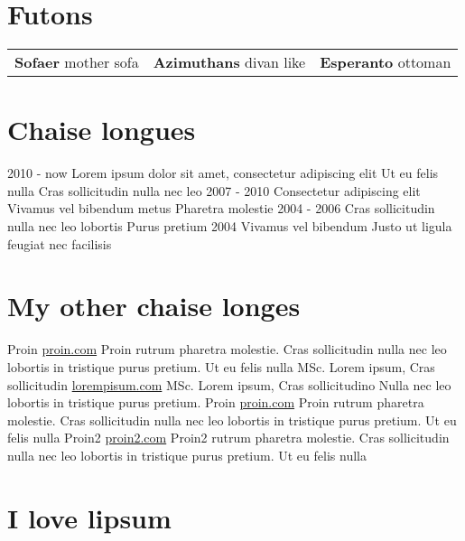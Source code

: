 \documentclass[]{viccuad-cv}
\begin{document}
\section{Futons}
    \begin{tabularx}{\linewidth}{XXr}
        \textbf{Sofaer} mother sofa & \textbf{Azimuthans} divan like & \textbf{Esperanto} ottoman \tabularnewline
    \end{tabularx}


\section{Chaise longues}
    \begin{entrylistdated}
      \entrydated
        {2010 - now}
        {Lorem ipsum dolor sit amet, consectetur adipiscing elit}
        {Ut eu felis nulla}
        {Cras sollicitudin nulla nec leo}
      \entrydated
        {2007 - 2010}
        {Consectetur adipiscing elit}
        {Vivamus vel bibendum metus}
        {Pharetra molestie}
      \entrydated
        {2004 - 2006}
        {Cras sollicitudin nulla nec leo lobortis}
        {}
        {Purus pretium}
      \entrydated
        {2004}
        {Vivamus vel bibendum}
        {Justo ut ligula feugiat nec facilisis}
        {}
    \end{entrylistdated}

\section{My other chaise longes}
    \begin{entrylist}
      \entry
        {Proin}
        {\href{https://proin.com}{proin.com}}
        {Proin rutrum pharetra molestie. Cras sollicitudin nulla nec leo lobortis in tristique purus pretium. Ut eu felis nulla}
      \entry
        {MSc. Lorem ipsum, Cras sollicitudin}
        {\href{http://loremipsum.com}{lorempisum.com}}
        {}
      \entry
        {MSc. Lorem ipsum, Cras sollicitudino}
        {}
        {Nulla nec leo lobortis in tristique purus pretium.}
      \entry
        {Proin}
        {\href{https://proin.com}{proin.com}}
        {Proin rutrum pharetra molestie. Cras sollicitudin nulla nec leo lobortis in tristique purus pretium. Ut eu felis nulla}
      \entry
        {Proin2}
        {\href{https://proin2.com}{proin2.com}}
        {Proin2 rutrum pharetra molestie. Cras sollicitudin nulla nec leo lobortis in tristique purus pretium. Ut eu felis nulla}
    \end{entrylist}







\framebreak

\section{I love lipsum}
\end{document}
